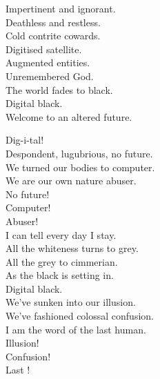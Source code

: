 


Impertinent and ignorant. \\
Deathless and restless. \\
Cold contrite cowards. \\

Digitised satellite. \\
Augmented entities. \\
Unremembered God. \\

The world fades to black. \\
Digital black. \\
Welcome to an altered future. \\




Dig-i-tal! \\

Despondent, lugubrious, no future. \\
We turned our bodies to computer. \\
We are our own nature abuser. \\

No future! \\
Computer! \\
Abuser! \\

I can tell every day I stay. \\
All the whiteness turns to grey. \\
All the grey to cimmerian. \\
As the black is setting in. \\

Digital black. \\

We've sunken into our illusion. \\
We've fashioned colossal confusion. \\
I am the word of the last human. \\

Illusion! \\
Confusion! \\
Last ! \\


